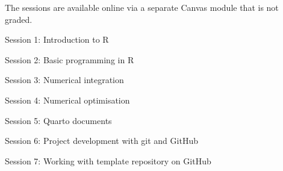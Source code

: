 \documentclass[10pt]{article}
\begin{document}
\begin{multicols}{2}
\smallskip\noindent The sessions are available online via a separate Canvas module that is not graded. 

\smallskip\noindent Session 1: Introduction to R

\smallskip\noindent Session 2: Basic programming in R

\smallskip\noindent Session 3: Numerical integration

\smallskip\noindent Session 4: Numerical optimisation

\smallskip\noindent Session 5: Quarto documents

\smallskip\noindent Session 6: Project development with git and GitHub

\smallskip\noindent Session 7: Working with template repository on GitHub


\vfill\null
\columnbreak


\end{multicols}
\end{document}
